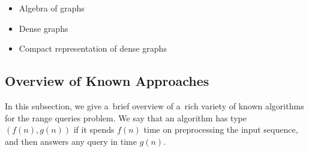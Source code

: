 \documentclass[11pt,letterpaper]{article}
\begin{document}
\begin{itemize}
  \item Algebra of graphs
  \item Dense graphs
  \item Compact representation of dense graphs
\end{itemize}




\subsection{Overview of Known Approaches}\label{subsec:approaches}
In this subsection, we give a~brief overview of a~rich variety of known algorithms for the range queries problem. We say that an algorithm has type $(f(n), g(n))$ if it spends $f(n)$ time on preprocessing the input sequence, and then answers any query in time $g(n)$.
\end{document}
